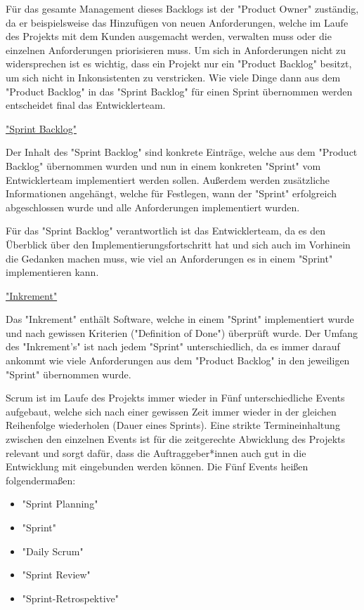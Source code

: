 Für das gesamte Management dieses Backlogs ist der "Product Owner" zuständig, da er beispielsweise das Hinzufügen von neuen Anforderungen, welche im Laufe des Projekts mit dem Kunden ausgemacht werden, verwalten muss oder die einzelnen Anforderungen priorisieren muss. Um sich in Anforderungen nicht zu widersprechen ist es wichtig, dass ein Projekt nur ein "Product Backlog" besitzt, um sich nicht in Inkonsistenten zu verstricken. Wie viele Dinge dann aus dem "Product Backlog" in das "Sprint Backlog" für einen Sprint übernommen werden entscheidet final das Entwicklerteam. \cite{ProductBacklog}

\underline{"Sprint Backlog"}

Der Inhalt des "Sprint Backlog" sind konkrete Einträge, welche aus dem "Product Backlog" übernommen wurden und nun in einem konkreten "Sprint" vom Entwicklerteam implementiert werden sollen. Außerdem werden zusätzliche Informationen angehängt, welche für Festlegen, wann der "Sprint" erfolgreich abgeschlossen wurde und alle Anforderungen implementiert wurden. 

Für das "Sprint Backlog" verantwortlich ist das Entwicklerteam, da es den Überblick über den Implementierungsfortschritt hat und sich auch im Vorhinein die Gedanken machen muss, wie viel an Anforderungen es in einem "Sprint" implementieren kann. \cite{SprintBacklog}

\underline{"Inkrement"}

Das "Inkrement" enthält Software, welche in einem "Sprint" implementiert wurde und nach gewissen Kriterien ("Definition of Done") überprüft wurde. Der Umfang des "Inkrement's" ist nach jedem "Sprint" unterschiedlich, da es immer darauf ankommt wie viele Anforderungen aus dem "Product Backlog" in den jeweiligen "Sprint" übernommen wurde. \cite{Inkrement}


Scrum ist im Laufe des Projekts immer wieder in Fünf unterschiedliche Events aufgebaut, welche sich nach einer gewissen Zeit immer wieder in der gleichen Reihenfolge wiederholen (Dauer eines Sprints). Eine strikte Termineinhaltung zwischen den einzelnen Events ist für die zeitgerechte Abwicklung des Projekts relevant und sorgt dafür, dass die Auftraggeber*innen auch gut in die Entwicklung mit eingebunden werden können. Die Fünf Events heißen folgendermaßen:

\begin{itemize}
    \item "Sprint Planning"
    \item "Sprint"
    \item "Daily Scrum"
    \item "Sprint Review"
    \item "Sprint-Retrospektive"
\end{itemize}

